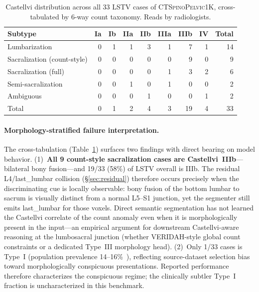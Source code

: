 \documentclass{article}
\newcommand{\dataset}{\textsc{CTSpinoPelvic1K}}
\begin{document}
\begin{table}[h]
\caption{Castellvi distribution across all 33 LSTV cases
of \dataset{}, cross-tabulated by 6-way count taxonomy.
Reads by radiologists.}
\label{tab:castellvi_dist}
\centering
\small
\setlength{\tabcolsep}{4pt}
\begin{tabular}{lrrrrrrrr}
\toprule
\bfseries Subtype & \bfseries Ia & \bfseries Ib & \bfseries IIa & \bfseries IIb & \bfseries IIIa & \bfseries IIIb & \bfseries IV & \bfseries Total \\
\midrule
Lumbarization                  & 0 & 1 & 1 & 3 & 1 & 7 & 1 & 14 \\
Sacralization (count-style)    & 0 & 0 & 0 & 0 & 0 & 9 & 0 & 9 \\
Sacralization (full)           & 0 & 0 & 0 & 0 & 1 & 3 & 2 & 6 \\
Semi-sacralization             & 0 & 0 & 1 & 0 & 1 & 0 & 0 & 2 \\
Ambiguous                      & 0 & 0 & 0 & 1 & 0 & 0 & 1 & 2 \\
\midrule
Total                          & 0 & 1 & 2 & 4 & 3 & 19 & 4 & 33 \\
\bottomrule
\end{tabular}
\end{table}

\paragraph{Morphology-stratified failure interpretation.}
The cross-tabulation (Table~\ref{tab:castellvi_dist})
surfaces two findings with direct bearing on model
behavior. (1)~\textbf{All 9 count-style sacralization
cases are Castellvi~IIIb}---bilateral bony fusion---and
19/33 (58\%) of LSTV overall is IIIb. The residual
L4/last\_lumbar collision (\S\ref{sec:residual})
therefore occurs precisely when the discriminating cue
is locally observable: bony fusion of the bottom lumbar
to sacrum is visually distinct from a normal L5--S1
junction, yet the segmenter still emits last\_lumbar
for those voxels. Direct semantic segmentation has not
learned the Castellvi correlate of the count anomaly
even when it is morphologically present in the input---an
empirical argument for downstream Castellvi-aware
reasoning at the lumbosacral junction (whether
VERIDAH-style global count constraints or a dedicated
Type~III morphology head). (2)~Only 1/33 cases is Type~I
(population prevalence
14--16\%~\citep{Sekharappa2014LumbosacralSignificance}),
reflecting source-dataset selection bias toward
morphologically conspicuous presentations. Reported
performance therefore characterizes the conspicuous
regime; the clinically subtler Type~I fraction is
uncharacterized in this benchmark.
\end{document}
